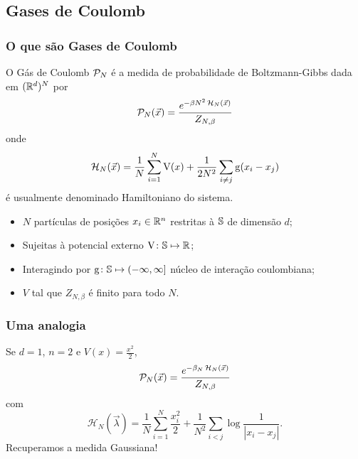 
\subsection{Gases de Coulomb}
\begin{frame}
	\frametitle{O que são Gases de Coulomb}
	O Gás de Coulomb $\mathcal{P}_N$ é a medida de probabilidade de Boltzmann-Gibbs dada em $(\mathbb{R}^d)^N$ por
	\[
		\mathcal{P}_N(\vec{x}) = \frac{e^{-\beta N^2 \operatorname{\mathcal{H}}_N(\vec{x})}}{Z_{N,\beta}}
	\] 
	onde 
	\[
		\operatorname{\mathcal{H}}_N(\vec{x}) = \frac{1}{N} \sum_{i = 1}^{N} \operatorname{V}(x) + \frac{1}{2N^2} \sum_{i \neq j} \operatorname{g}(x_i - x_j)
	\]
	é usualmente denominado Hamiltoniano do sistema.
\end{frame}
\begin{frame}
	\begin{itemize}
	\item $N$ partículas de posições $x_i \in \mathbb{R}^n$ restritas à $\mathbb{S}$ de dimensão $d$;
	\item Sujeitas à potencial externo $\operatorname{V} \colon \mathbb{S} \mapsto \mathbb{R}$;
	\item Interagindo por $\operatorname{g} \colon \mathbb{S} \mapsto (-\infty, \infty]$ núcleo de interação coulombiana;
	\item $V$ tal que  $Z_{N, \beta}$ é finito para todo $N$.
	\end{itemize}
\end{frame}
\begin{frame}
	\frametitle{Uma analogia}	
	Se $d = 1$, $n=2$ e $V(x) = \frac{x^2}{2}$,
	\[
	\mathcal{P}_N(\vec{x}) = \frac{e^{-\beta_N \operatorname{\mathcal{H}}_N(\vec{x})}}{Z_{N,\beta}}
	\]
	com 
	\[
	\mathcal{H}_N(\vec{\lambda}) = \frac{1}{N}\sum_{i = 1}^{N} \frac{x_i^2}{2} + \frac{1}{N^2} \sum_{i < j} \log{\frac{1}{|x_i - x_j|}}.
	\]
	Recuperamos a medida Gaussiana!
\end{frame}

